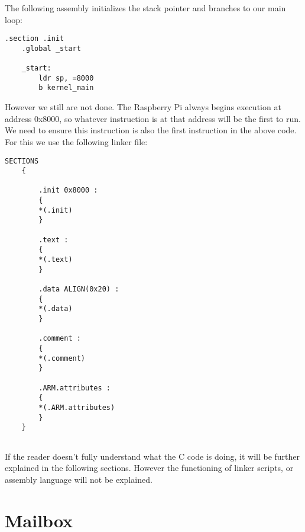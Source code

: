 \documentclass[12pt]{book}
\begin{document}
The following assembly initializes the stack pointer and branches to our main loop:
\lstset{language=ASM}
\begin{lstlisting}[style = ASM]
	.section .init
	.global _start
	
	_start:
		ldr sp, =8000
		b kernel_main
\end{lstlisting}

However we still are not done. The Raspberry Pi always begins execution at address 0x8000, so whatever instruction is at that address will be the first to run. We need to ensure this instruction is also the first instruction in the above code. For this we use the following linker file:

\lstset{language=Linker}
\begin{lstlisting}[style = C]
	SECTIONS 
	{
	
		.init 0x8000 : 
		{
		*(.init)
		}
		
		.text : 
		{
		*(.text)
		}
		
		.data ALIGN(0x20) : 
		{
		*(.data)
		}
		
		.comment :
		{
		*(.comment)
		}
		
		.ARM.attributes :
		{
		*(.ARM.attributes)
		}
	}
	
\end{lstlisting}

If the reader doesn't fully understand what the C code is doing, it will be further explained in the following sections. However the functioning of linker scripts, or assembly language will not be explained.
	
\section{Mailbox}
\label{sec:mailbox}
\end{document}
